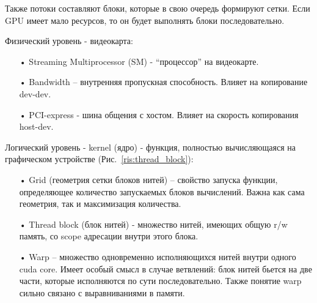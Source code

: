 \documentclass[a4paper,14pt,russian]{extreport}
\begin{document}
\par Также потоки составляют блоки, которые в свою очередь формируют сетки. Если GPU имеет мало ресурсов, то он будет выполнять блоки последовательно. 
\par Физический уровень - видеокарта:
  \begin{itemize}
  \item[•] Streaming Multiprocessor (SM) - “процессор” на видеокарте.
  \item[•] Bandwidth – внутренняя пропускная способность. Влияет на копирование dev-dev.
  \item[•] PCI-express - шина общения с хостом. Влияет на скорость копирования host-dev.
  \end{itemize}
\par Логический уровень - kernel (ядро) - функция, полностью вычисляющаяся на графическом устройстве (Рис.~\ref{ris:thread_block}):
  \begin{itemize}
  \item[•] Grid (геометрия сетки блоков нитей) – свойство запуска функции, определяющее количество запускаемых блоков вычислений. Важна как сама геометрия, так и максимизация количества.
  \item[•] Thread block (блок нитей) - множество нитей, имеющих общую r/w память, со scope адресации внутри этого блока.
  \item[•] Warp – множество одновременно исполняющихся нитей внутри одного cuda core. Имеет особый смысл в случае ветвлений: блок нитей бьется на две части, которые исполняются по сути последовательно. Также понятие warp сильно связано с выравниваниями в памяти.
  \end{itemize}
\par
\end{document}
